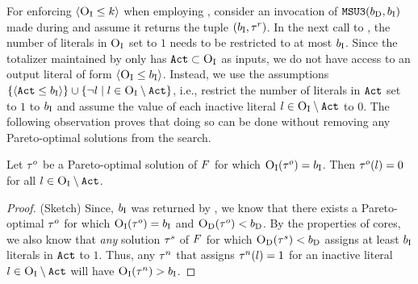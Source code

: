 For enforcing $\langle \textsc{O}_{\text{I}} \leq k \rangle$ when employing \msu{}, consider an invocation of $\texttt{MSU3}(b_{\text{D}}, b_{\text{I}})$ made during \algname{} and assume it returns the tuple $(b_{\text{I}}, \tau^r)$. 
In the next call to \Simpr{}, the number of literals in $\textsc{O}_{\text{I}}$ set to $1$ needs to be restricted to at most $b_{\text{I}}$. 
Since the totalizer maintained by \msu{} only has $\texttt{Act} \subset \textsc{O}_{\text{I}}$ as inputs, we do not have access to an output literal of form  $\langle \textsc{O}_{\text{I}} \leq b_{\text{I}} \rangle$.
Instead, we use  the assumptions $\{ \langle \texttt{Act} \leq b_{\text{I}} \rangle\} \cup \{ \lnot l \mid l \in \textsc{O}_{\text{I}} \setminus \texttt{Act} \}$, i.e., restrict the number of literals in $\texttt{Act}$ set to $1$ to $b_{\text{I}}$ and assume the value of each inactive literal $l \in \textsc{O}_{\text{I}} \setminus \texttt{Act}$ to $0$. 
The following observation proves that doing so can be done without removing any Pareto-optimal solutions from the search. 
\begin{observation}\label{obs:sound}
  Let $\tau^o$ be a Pareto-optimal solution of $F$ for which $\textsc{O}_{\text{I}}(\tau^o) = b_{\text{I}}$.
  Then $\tau^o(l) = 0$ for all $l \in \textsc{O}_{\text{I}} \setminus \texttt{Act}$. 
\end{observation}
\begin{proof}(Sketch)
  Since, $b_{\text{I}}$ was returned by \msu{}, we know that there exists a Pareto-optimal $\tau^o$ for which $\textsc{O}_{\text{I}}(\tau^o) = b_{\text{I}}$ and $\textsc{O}_{\text{D}}(\tau^o) < b_{\text{D}}$.
  By the properties of cores, we also know that \emph{any} solution $\tau^s$ of $F$ for which $\textsc{O}_{\text{D}}(\tau^s) < b_{\text{D}}$ assigns at least $b_{\text{I}}$ literals in $\texttt{Act}$ to $1$.
  Thus, any $\tau^n$ that assigns $\tau^n(l) = 1$ for an inactive literal $l \in \textsc{O}_{\text{I}} \setminus \texttt{Act}$ will have $\textsc{O}_{\text{I}}(\tau^n) > b_{\text{I}}$.
\end{proof}

